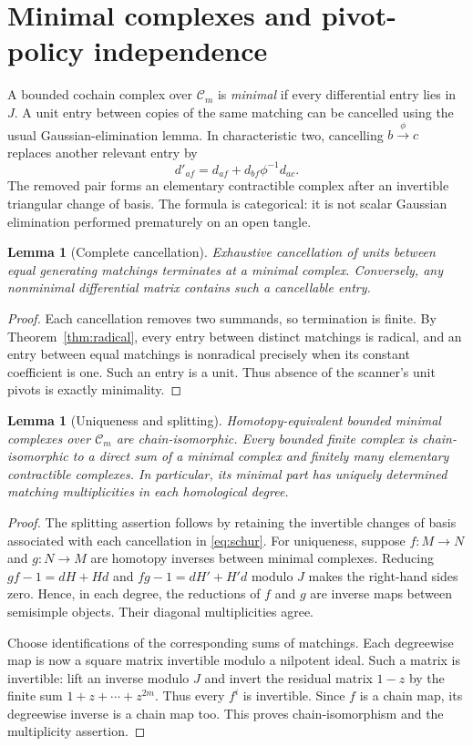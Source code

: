 \documentclass[11pt]{article}
\newtheorem{lemma}[theorem]{Lemma}
\theoremstyle{definition}\newtheorem{definition}[theorem]{Definition}
\theoremstyle{remark}\newtheorem{remark}[theorem]{Remark}
\begin{document}
\section{Minimal complexes and pivot-policy independence}
\label{sec:minimal}
A bounded cochain complex over $\mathcal C_m$ is \emph{minimal} if every differential entry lies in $J$. A unit entry between copies of the same matching can be cancelled using the usual Gaussian-elimination lemma. In characteristic two, cancelling $b\xrightarrow{\phi}c$ replaces another relevant entry by
\begin{equation}
 d'_{af}=d_{af}+d_{bf}\phi^{-1}d_{ac}.\label{eq:schur}
\end{equation}
The removed pair forms an elementary contractible complex after an invertible triangular change of basis. The formula is categorical: it is not scalar Gaussian elimination performed prematurely on an open tangle.

\begin{lemma}[Complete cancellation]\label{lem:complete}
Exhaustive cancellation of units between equal generating matchings terminates at a minimal complex. Conversely, any nonminimal differential matrix contains such a cancellable entry.
\end{lemma}
\begin{proof}
Each cancellation removes two summands, so termination is finite. By Theorem~\ref{thm:radical}, every entry between distinct matchings is radical, and an entry between equal matchings is nonradical precisely when its constant coefficient is one. Such an entry is a unit. Thus absence of the scanner's unit pivots is exactly minimality.
\end{proof}

\begin{lemma}[Uniqueness and splitting]\label{lem:minimalunique}
Homotopy-equivalent bounded minimal complexes over $\mathcal C_m$ are chain-isomorphic. Every bounded finite complex is chain-isomorphic to a direct sum of a minimal complex and finitely many elementary contractible complexes. In particular, its minimal part has uniquely determined matching multiplicities in each homological degree.
\end{lemma}
\begin{proof}
The splitting assertion follows by retaining the invertible changes of basis associated with each cancellation in \eqref{eq:schur}. For uniqueness, suppose $f:M\to N$ and $g:N\to M$ are homotopy inverses between minimal complexes. Reducing $gf-1=dH+Hd$ and $fg-1=dH'+H'd$ modulo $J$ makes the right-hand sides zero. Hence, in each degree, the reductions of $f$ and $g$ are inverse maps between semisimple objects. Their diagonal multiplicities agree.

Choose identifications of the corresponding sums of matchings. Each degreewise map is now a square matrix invertible modulo a nilpotent ideal. Such a matrix is invertible: lift an inverse modulo $J$ and invert the residual matrix $1-z$ by the finite sum $1+z+\cdots+z^{2m}$. Thus every $f^i$ is invertible. Since $f$ is a chain map, its degreewise inverse is a chain map too. This proves chain-isomorphism and the multiplicity assertion.
\end{proof}
\end{document}
